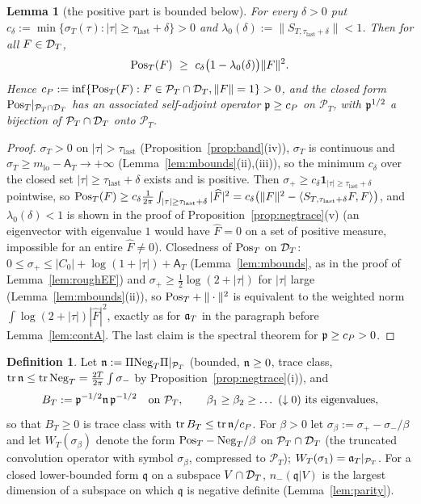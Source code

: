 \documentclass[11pt]{amsart}
\newtheorem{lemma}[theorem]{Lemma}
\theoremstyle{definition}
\newtheorem{definition}[theorem]{Definition}
\theoremstyle{remark}
\newcommand{\PT}{\mathcal P_T}
\newcommand{\sT}{\sigma_T}
\newcommand{\Fh}{\widehat F}
\newcommand{\Aconst}{\mathsf A_T}
\begin{document}
\begin{lemma}[the positive part is bounded below]\label{lem:wh-cP}
For every $\delta>0$ put $c_\delta:=\min\{\sT(\tau):|\tau|\ge\tau_{\mathrm{last}}+\delta\}>0$ and
$\lambda_0(\delta):=\|S_{T,\tau_{\mathrm{last}}+\delta}\|<1$. Then for all $F\in\mathcal D_T$,
\[
\Pos(F)\ \ge\ c_\delta\big(1-\lambda_0(\delta)\big)\|F\|^2 .
\]
Hence $c_P:=\inf\{\Pos(F):F\in\PT\cap\DT,\|F\|=1\}>0$, and the closed form $\Pos|_{\PT\cap\DT}$ has an
associated self-adjoint operator $\mathfrak p\ge c_P$ on $\PT$, with $\mathfrak p^{1/2}$ a bijection of $\PT\cap\DT$ onto $\PT$.
\end{lemma}
\begin{proof}
$\sT>0$ on $|\tau|>\tau_{\mathrm{last}}$ (Proposition~\ref{prop:band}(iv)), $\sT$ is continuous and
$\sT\ge m_{\mathrm{lo}}-\Aconst\to+\infty$ (Lemma~\ref{lem:mbounds}(ii),(iii)), so the minimum
$c_\delta$ over the closed set $|\tau|\ge\tau_{\mathrm{last}}+\delta$ exists and is positive. Then
$\sigma_+\ge c_\delta\mathbf 1_{|\tau|\ge\tau_{\mathrm{last}}+\delta}$ pointwise, so
$\Pos(F)\ge c_\delta\frac1{2\pi}\int_{|\tau|\ge\tau_{\mathrm{last}}+\delta}|\Fh|^2
=c_\delta\big(\|F\|^2-\langle S_{T,\tau_{\mathrm{last}}+\delta}F,F\rangle\big)$, and $\lambda_0(\delta)<1$
is shown in the proof of Proposition~\ref{prop:negtrace}(v) (an eigenvector with eigenvalue $1$ would
have $\Fh=0$ on a set of positive measure, impossible for an entire $\Fh\ne0$). Closedness of
$\mathrm{Pos}_T$ on $\mathcal D_T$: $0\le\sigma_+\le|C_0|+\log(1+|\tau|)+\Aconst$ (Lemma~\ref{lem:mbounds}, as in the
proof of Lemma~\ref{lem:roughEF}) and $\sigma_+\ge\frac12\log(2+|\tau|)$ for $|\tau|$ large
(Lemma~\ref{lem:mbounds}(ii)), so $\mathrm{Pos}_T+\|\cdot\|^2$ is equivalent to the weighted norm
$\int\log(2+|\tau|)|\Fh|^2$, exactly as for $\mathfrak a_T$ in the paragraph before Lemma~\ref{lem:contA}. The
last claim is the spectral theorem for $\mathfrak p\ge c_P>0$.
\end{proof}

\begin{definition}\label{def:wh-B}
Let $\fn:=\Pi\Neg\Pi|_{\PT}$ (bounded, $\mathfrak n\ge0$, trace class, $\operatorname{tr}\mathfrak n\le\operatorname{tr}\mathrm{Neg}_T=\frac{2T}{2\pi}\int\sigma_-$
by Proposition~\ref{prop:negtrace}(i)), and
\[
B_T:=\fp^{-1/2}\fn\,\fp^{-1/2}\quad\text{on }\PT,\qquad \beta_1\ge\beta_2\ge\dots\ (\downarrow0)\ \text{its eigenvalues},
\]
so that $B_T\ge0$ is trace class with $\operatorname{tr} B_T\le\operatorname{tr}\mathfrak n/c_P$. For $\beta>0$ let
$\sigma_\beta:=\sigma_+-\sigma_-/\beta$ and let $W_T(\sigma_\beta)$ denote the form $\mathrm{Pos}_T-\mathrm{Neg}_T/\beta$ on
$\PT\cap\DT$ (the truncated convolution operator with symbol $\sigma_\beta$, compressed to $\PT$);
$W_T(\sigma_1)=\fa|_{\PT}$. For a closed lower-bounded form $\mathfrak q$ on a subspace $V\cap\mathcal D_T$,
$n_-(\mathfrak q|V)$ is the largest dimension of a subspace on which $\mathfrak q$ is negative definite
(Lemma~\ref{lem:parity}).
\end{definition}
\end{document}
